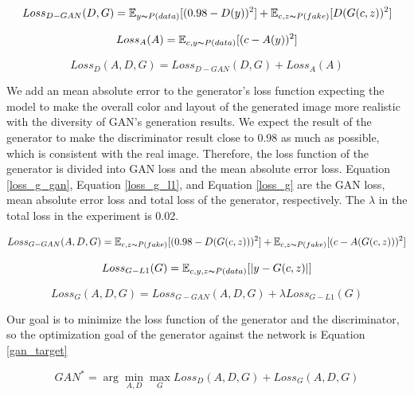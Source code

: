 \begin{equation}
    Loss_{D-GAN}(D,G)=
    \mathbb{E}_{y\thicksim P(data)}[(0.98-D(y))^2]+
    \mathbb{E}_{c,z\thicksim P(fake)}[D(G(c,z))^2]
    \label{loss_d_gan}
\end{equation}


\begin{equation}
    Loss_{A}(A)=
    \mathbb{E}_{c,y\thicksim P(data)}[(c-A(y))^2]
    \label{loss_d_a}
\end{equation}

\begin{equation}
    Loss_{D}(A,D,G)=
    Loss_{D-GAN}(D,G)+
    Loss_{A}(A)
    \label{loss_d}
\end{equation}

We add an mean absolute error to the generator's loss function expecting the model to make the overall color and layout of the generated image more realistic with the diversity of GAN's generation results.
We expect the result of the generator to make the discriminator result close to 0.98 as much as possible, which is consistent with the real image.
Therefore, the loss function of the generator is divided into GAN loss and the mean absolute error loss.
Equation \eqref{loss_g_gan}, Equation \eqref{loss_g_l1}, and Equation \eqref{loss_g} are the GAN loss, mean absolute error loss and total loss of the generator, respectively.
The $\lambda$ in the total loss in the experiment is 0.02.

\begin{equation}
    Loss_{G-GAN}(A,D,G)=
    \mathbb{E}_{c,z\thicksim P(fake)}[(0.98-D(G(c,z)))^2]+
    \mathbb{E}_{c,z\thicksim P(fake)}[(c-A(G(c,z)))^2]
    \label{loss_g_gan}
\end{equation}

\begin{equation}
    Loss_{G-L1}(G)=
    \mathbb{E}_{c,y,z\thicksim P(data)}[|y-G(c,z)|]
    \label{loss_g_l1}
\end{equation}

\begin{equation}
    Loss_{G}(A,D,G)=
    Loss_{G-GAN}(A,D,G)+
    \lambda Loss_{G-L1}(G)
    \label{loss_g}
\end{equation}

Our goal is to minimize the loss function of the generator and the discriminator, so the optimization goal of the generator against the network is Equation \eqref{gan_target}

\begin{equation}
    GAN^*=\arg \min_{A,D} \max_{G}Loss_{D}(A,D,G)+Loss_{G}(A,D,G)
    \label{gan_target}
\end{equation}


